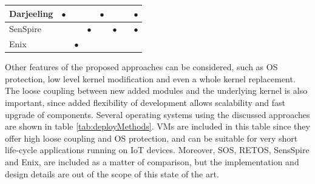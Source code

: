 \begin{table}[htb]
\begin{tabular}{lccccccc}
		Darjeeling \cite{brouwers2009darjeeling} & $\bullet$           &              &                 & $\bullet$                      &                              &                             & $\bullet$                       \\ \hline
		SenSpire \cite{dong2009dynamic}   &             &              & $\bullet$               &                        & $\bullet$                            &                             & $\bullet$                       \\ \hline
		Enix \cite{chen2010enix}       &             & $\bullet$            &                 &                        &                              &                             &                         \\ \hline
	\end{tabular}
\end{table}

Other features of the proposed approaches can be considered, such as OS protection, low level kernel modification and even a whole kernel replacement.
The loose coupling between new added modules and the underlying kernel is also important, since added flexibility of development allows scalability and fast upgrade of components.
Several operating systems using the discussed approaches are shown in table \ref{tab:deployMethods}.
VMs are included in this table since they offer high loose coupling and OS protection, and can be suitable for very short life-cycle applications running on IoT devices.
Moreover, SOS, RETOS, SensSpire and Enix, are included as a matter of comparison, but the implementation and design details are out of the scope of this state of the art. 

